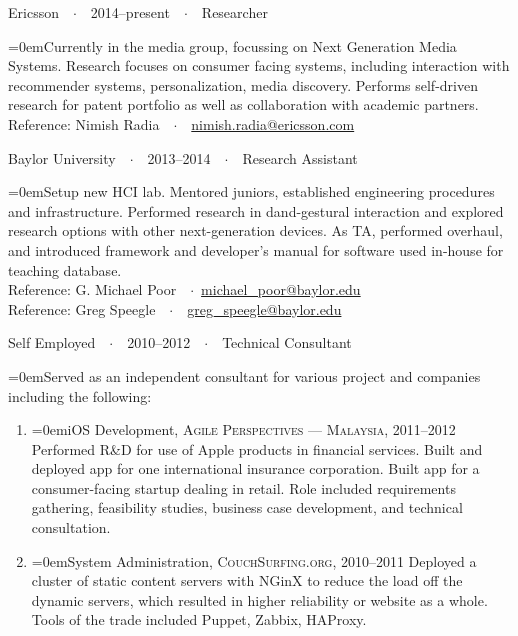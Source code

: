 \documentclass[a4paper]{scrartcl}
\newcommand{\Description}[1]{\hangindent=0em\hangafter=0\noindent\footnotesize{#1}\par\normalsize\vspace{1em}} %
\newcommand{\Redvline}[0]{\vspace{0.5em}\noindent{\color{ThemeColor}\rule{18cm}{0.4pt}}}
\newcommand{\MyName}[1]{\noindent{\textsc{\LARGE{\color{ThemeColor}#1}}}} %
\newcommand{\NewBlock}[3]{
    #1\ \ $\cdotp$\ \ #2\ \ $\cdotp$\ \ #3}
\newcommand{\BlockTitle}[1]{\textsc{\vspace{0.15em}}\noindent{\spacedlowsmallcaps{#1}}\vspace{1em}}
\begin{document}

\Redvline

\BlockTitle{Work Experience}

\NewBlock{Ericsson}{2014--present}{Researcher}

\Description{Currently in the media group, focussing on Next Generation Media Systems. Research focuses on consumer facing systems, including interaction with recommender systems, personalization, media discovery. Performs self-driven research for patent portfolio as well as collaboration with academic partners.
\\Reference: Nimish Radia\ \ $\cdotp$\ \ \href{mailto:nimish.radia@ericsson.com}{nimish.radia@ericsson.com}}

\NewBlock{Baylor University}{2013--2014}{Research Assistant}

\Description{Setup new HCI lab. Mentored juniors, established engineering procedures and infrastructure. Performed research in dand-gestural interaction and explored research options with other next-generation devices. As TA, performed overhaul, and introduced framework and developer's manual for software used in-house for teaching database. \\
Reference: G. Michael Poor\ \ $\cdotp$\ \href{mailto:michael\_poor@baylor.edu}{michael\_poor@baylor.edu} \\
Reference: Greg Speegle\ \ $\cdotp$\ \ \href{mailto:greg\_speegle@baylor.edu}{greg\_speegle@baylor.edu}}


\NewBlock{Self Employed}{2010--2012}{Technical Consultant}

\Description{Served as an independent consultant for various project and companies including the following:}
\begin{enumerate}
\item[] \Description{iOS Development, \textsc{Agile Perspectives --- Malaysia}, 2011--2012
\newline
Performed R\&D for use of Apple products in financial services. Built and deployed app for one international insurance corporation. Built app for a consumer-facing startup dealing in retail. Role included requirements gathering, feasibility studies, business case development, and technical consultation. }

\item[] \Description{System Administration, \textsc{CouchSurfing.org}, 2010--2011
\newline
Deployed a cluster of static content servers with NGinX to reduce the load off the dynamic servers, which resulted in higher reliability or website as a whole. Tools of the trade included Puppet, Zabbix, HAProxy. }
\end{enumerate}
\end{document}

